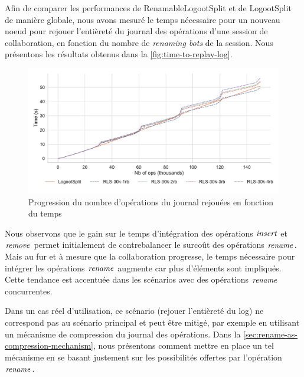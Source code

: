 \label{sec:validation-results-time-replay-log}

Afin de comparer les performances de RenamableLogootSplit et de LogootSplit de manière globale, nous avons mesuré le temps nécessaire pour un nouveau noeud pour rejouer l'entièreté du journal des opérations d'une session de collaboration, en fonction du nombre de \emph{renaming bots} de la session.
Nous présentons les résultats obtenus dans la \autoref{fig:time-to-replay-log}.

\begin{figure}[!ht]
  \centering
  \includegraphics[width=\columnwidth]{img/replay-log-30k-2022-10-27}
  \caption{Progression du nombre d'opérations du journal rejouées en fonction du temps}
  \label{fig:time-to-replay-log}
\end{figure}

Nous observons que le gain sur le temps d'intégration des opérations $\mathit{insert}$ et $\mathit{remove}$ permet initialement de contrebalancer le surcoût des opérations $\mathit{rename}$.
Mais au fur et à mesure que la collaboration progresse, le temps nécessaire pour intégrer les opérations $\mathit{rename}$ augmente car plus d'éléments sont impliqués.
Cette tendance est accentuée dans les scénarios avec des opérations $\mathit{rename}$ concurrentes.

Dans un cas réel d'utilisation, ce scénario (\ie rejouer l'entièreté du log) ne correspond pas au scénario principal et peut être mitigé, par exemple en utilisant un mécanisme de compression du journal des opérations.
Dans la \autoref{sec:rename-as-compression-mechanism}, nous présentons comment mettre en place un tel mécanisme en se basant justement sur les possibilités offertes par l'opération $\mathit{rename}$.
